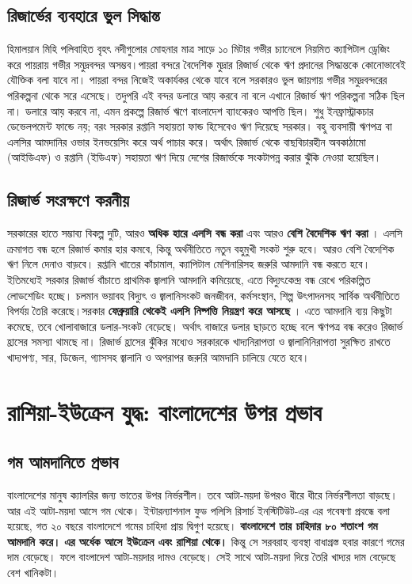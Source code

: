 \documentclass[11pt]{article}
\begin{document}
\subsection{রিজার্ভের ব্যবহারে ভুল সিদ্ধান্ত}
\label{sec:orga930952}
হিমালয়ান মিহি পলিবাহিত বৃহৎ নদীগুলোর মোহনার মাত্র সাড়ে ১০ মিটার গভীর
চ্যানেলে নিয়মিত ক্যাপিটাল ড্রেজিং করে পায়রায় গভীর সমুদ্রবন্দর অসম্ভব।পায়রা
বন্দরে বৈদেশিক মুদ্রার রিজার্ভ থেকে ঋণ প্রদানের সিদ্ধান্তকে কোনোভাবেই যৌক্তিক
বলা যাবে না। পায়রা বন্দর নিজেই অকার্যকর থেকে যাবে বলে সরকারও ভুল জায়গায়
গভীর সমুদ্রবন্দরের পরিকল্পনা থেকে সরে এসেছে। তদুপরি এই বন্দর ডলারে আয় করবে
না বলে এখানে রিজার্ভ ঋণ পরিকল্পনা সঠিক ছিল না। ডলারে আয় করবে না, এমন
প্রকল্পে রিজার্ভ ঋণে বাংলাদেশ ব্যাংকেরও আপত্তি ছিল। শুধু ইনফ্রাস্ট্রাকচার
ডেভেলপমেন্ট ফান্ডে নয়; বরং সরকার রপ্তানি সহায়তা ফান্ড হিসেবেও ঋণ দিয়েছে
সরকার। বহু ব্যবসায়ী ঋণপত্র বা এলসির আমদানির ওভার ইনভয়েসিং করে অর্থ পাচার
করে। অর্থাৎ রিজার্ভ থেকে বাছবিচারহীন অবকাঠামো (আইডিএফ) ও রপ্তানি (ইডিএফ)
সহায়তা ঋণ দিয়ে দেশের রিজার্ভকে সংকটাপন্ন করার ঝুঁকি নেওয়া হয়েছিল।

\subsection{রিজার্ভ সংরক্ষণে করনীয়}
\label{sec:org9b25aec}
সরকারের হাতে সম্ভাব্য বিকল্প দুটি, আরও \textbf{অধিক হারে এলসি বন্ধ করা} এবং আরও \textbf{বেশি
বৈদেশিক ঋণ করা} । এলসি ক্রমাগত বন্ধ হলে রিজার্ভ কমার হার কমবে, কিন্তু
অর্থনীতিতে নতুন বহুমুখী সংকট শুরু হবে। আরও বেশি বৈদেশিক ঋণ নিলে দেনাও বাড়বে।
রপ্তানি খাতের কাঁচামাল, ক্যাপিটাল মেশিনারিসহ জরুরি আমদানি বন্ধ করতে হবে।
ইতিমধ্যেই সরকার রিজার্ভ বাঁচাতে প্রাথমিক জ্বালানি আমদানি কমিয়েছে, এতে
বিদ্যুৎকেন্দ্র বন্ধ রেখে পরিকল্পিত লোডশেডিং হচ্ছে। চলমান ভয়াবহ বিদ্যুৎ ও
জ্বালানিসংকট জনজীবন, কর্মসংস্থান, শিল্প উৎপাদনসহ সার্বিক অর্থনীতিতে বিপর্যয়
তৈরি করেছে।সরকার \textbf{ফেব্রুয়ারি থেকেই এলসি নিষ্পত্তি নিয়ন্ত্রণ করে আসছে} । এতে আমদানি ব্যয়
কিছুটা কমেছে, তবে খোলাবাজারে ডলার-সংকট বেড়েছে। অর্থাৎ বাজারে ডলার ছাড়তে
হচ্ছে বলে ঋণপত্র বন্ধ করেও রিজার্ভ হ্রাসের সমস্যা থামছে না। রিজার্ভ হ্রাসের
ঝুঁকির মধ্যেও সরকারকে খাদ্যনিরাপত্তা ও জ্বালানিনিরাপত্তা সুরক্ষিত রাখতে
খাদ্যপণ্য, সার, ডিজেল, গ্যাসসহ জ্বালানি ও অপরাপর জরুরি আমদানি চালিয়ে যেতে
হবে।

\section{রাশিয়া-ইউক্রেন যুদ্ধ: বাংলাদেশের উপর প্রভাব}
\label{sec:org19d460d}
\subsection{গম আমদানিতে প্রভাব}
\label{sec:org89f298b}
বাংলাদেশের মানুষ ক্যালরির জন্য ভাতের উপর নির্ভরশীল। তবে আটা-ময়দা উপরও ধীরে
ধীরে নির্ভরশীলতা বাড়ছে। আর এই আটা-ময়দা আসে গম থেকে। ইন্টারন্যাশনাল ফুড
পলিসি রিসার্চ ইনস্টিটিউট-এর এর গবেষণা প্রবন্ধে বলা হয়েছে, গত ২০ বছরে
বাংলাদেশে গমের চাহিদা প্রায় দ্বিগুণ হয়েছে। \textbf{বাংলাদেশে তার চাহিদার ৮০ শতাংশ
গম আমদানি করে।} \textbf{এর অর্ধেক আসে ইউক্রেন এবং রাশিয়া থেকে।} কিন্তু সে সরবরাহ
ব্যবস্থা বাধাগ্রস্ত হবার কারণে গমের দাম বেড়েছে। ফলে বাংলাদেশ আটা-ময়দার
দামও বেড়েছে। সেই সাথে আটা-ময়দা দিয়ে তৈরি খাদ্যর দাম বেড়েছে বেশ খানিকটা।
\end{document}
